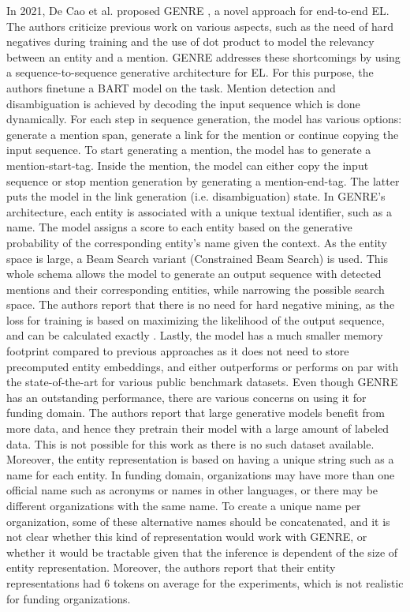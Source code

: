 \documentclass{report}
\theoremstyle{definition}
\theoremstyle{remark}
\begin{document}
In 2021, De Cao et al. proposed GENRE \cite{GENRE}, a novel approach for end-to-end EL. The authors criticize previous work on various aspects, such as the need of hard negatives during training and the use of dot product to model the relevancy between an entity and a mention. GENRE addresses these shortcomings by using a sequence-to-sequence generative architecture for EL. For this purpose, the authors finetune a BART \cite{bart} model on the task. Mention detection and disambiguation is achieved by decoding the input sequence which is done dynamically. For each step in sequence generation, the model has various options: generate a mention span, generate a link for the mention or continue copying the input sequence. To start generating a mention, the model has to generate a mention-start-tag. Inside the mention, the model can either copy the input sequence or stop mention generation by generating a mention-end-tag. The latter puts the model in the link generation (i.e. disambiguation) state. In GENRE's architecture, each entity is associated with a unique textual identifier, such as a name. The model assigns a score to each entity based on the generative probability of the corresponding entity's name given the context. As the entity space is large, a Beam Search \cite{beamsearch} variant (Constrained Beam Search) is used. This whole schema allows the model to generate an output sequence with detected mentions and their corresponding entities, while narrowing the possible search space. The authors report that there is no need for hard negative mining, as the loss for training is based on maximizing the likelihood of the output sequence, and can be calculated exactly \cite{GENRE}. Lastly, the model has a much smaller memory footprint compared to previous approaches as it does not need to store precomputed entity embeddings, and either outperforms or performs on par with the state-of-the-art for various public benchmark datasets. Even though GENRE has an outstanding performance, there are various concerns on using it for funding domain. The authors report that large generative models benefit from more data, and hence they pretrain their model with a large amount of labeled data. This is not possible for this work as there is no such dataset available. Moreover, the entity representation is based on having a unique string such as a name for each entity. In funding domain, organizations may have more than one official name such as acronyms or names in other languages, or there may be different organizations with the same name. To create a unique name per organization, some of these alternative names should be concatenated, and it is not clear whether this kind of representation would work with GENRE, or whether it would be tractable given that the inference is dependent of the size of entity representation. Moreover, the authors report that their entity representations had 6 tokens on average for the experiments, which is not realistic for funding organizations.
\end{document}
